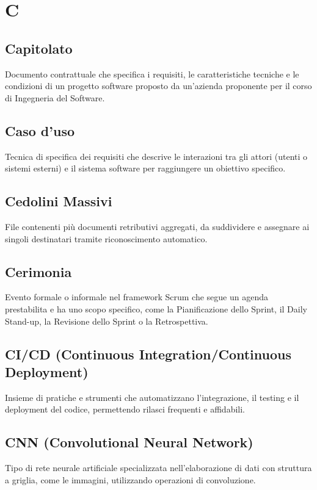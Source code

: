 \documentclass[a4paper,11pt]{article}
\begin{document}
\newpage
\section{C}

\subsection{Capitolato}
Documento contrattuale che specifica i requisiti, le caratteristiche tecniche e le condizioni di un progetto software proposto da un'azienda proponente per il corso di Ingegneria del Software.

\subsection{Caso d'uso}
Tecnica di specifica dei requisiti che descrive le interazioni tra gli attori (utenti o sistemi esterni) e il sistema software per raggiungere un obiettivo specifico.

\subsection{Cedolini Massivi}
File contenenti più documenti retributivi aggregati, da suddividere e assegnare ai singoli destinatari tramite riconoscimento automatico.

\subsection{Cerimonia}
Evento formale o informale nel framework Scrum che segue un agenda prestabilita e ha uno scopo specifico, come la Pianificazione dello Sprint, il Daily Stand-up, la Revisione dello Sprint o la Retrospettiva.

\subsection{CI/CD (Continuous Integration/Continuous Deployment)}
Insieme di pratiche e strumenti che automatizzano l'integrazione, il testing e il deployment del codice, permettendo rilasci frequenti e affidabili.

\subsection{CNN (Convolutional Neural Network)}
Tipo di rete neurale artificiale specializzata nell'elaborazione di dati con struttura a griglia, come le immagini, utilizzando operazioni di convoluzione.
\end{document}
